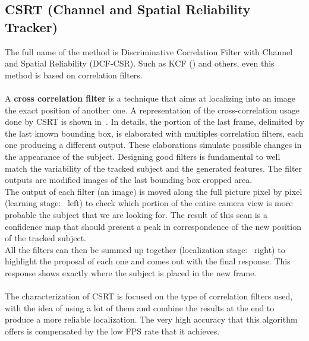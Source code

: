 \subsection{CSRT (Channel and Spatial Reliability Tracker)}
The full name of the method is Discriminative Correlation Filter with Channel and Spatial Reliability (DCF-CSR)\cite{csrt}. Such as KCF () and others, even this method is based on correlation filters.\\
\\
A \textbf{cross correlation filter} is a technique that aims at localizing into an image the exact position of another one. A representation of the cross-correlation usage done by CSRT is shown in~. In details, the portion of the last frame, delimited by the last known bounding box, is elaborated with multiples correlation filters, each one producing a different output. These elaborations simulate possible changes in the appearance of the subject. Designing good filters is fundamental to well match the variability of the tracked subject and the generated features. The filter outputs are modified images of the last bounding box cropped area.\\
The output of each filter (an image) is moved along the full picture pixel by pixel (learning stage:~ left) to check which portion of the entire camera view is more probable the subject that we are looking for. The result of this scan is a confidence map that should present a peak in correspondence of the new position of the tracked subject.\\
All the filters can then be summed up together (localization stage:~ right) to highlight the proposal of each one and comes out with the final response. This response shows exactly where the subject is placed in the new frame.\\
\\
The characterization of CSRT is focused on the type of correlation filters used, with the idea of using a lot of them and combine the results at the end to produce a more reliable localization. The very high accuracy that this algorithm offers is compensated by the low FPS rate that it achieves.

